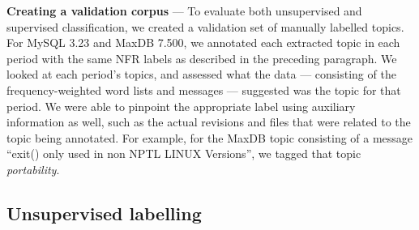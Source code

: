 \documentclass[]{sig-alternate}
\begin{document}
\noindent \textbf{Creating a validation corpus} --- To evaluate both unsupervised and supervised classification, we created a validation set of manually labelled topics. For MySQL 3.23 and MaxDB 7.500, we annotated each extracted topic in each period with the same NFR labels as described in the preceding paragraph. 
We looked at each period's topics, and assessed what the data --- consisting of the frequency-weighted word lists and messages --- suggested was the topic for that period. 
We were able to pinpoint the appropriate label using auxiliary information as well, such as the actual revisions and files that were related to the topic being annotated.
For example, for the MaxDB topic consisting of a message ``exit() only used in non NPTL LINUX Versions'', we tagged that topic \emph{portability}. 

\subsection{Unsupervised labelling}
\label{sec:unsuplabelling}




\end{document}
